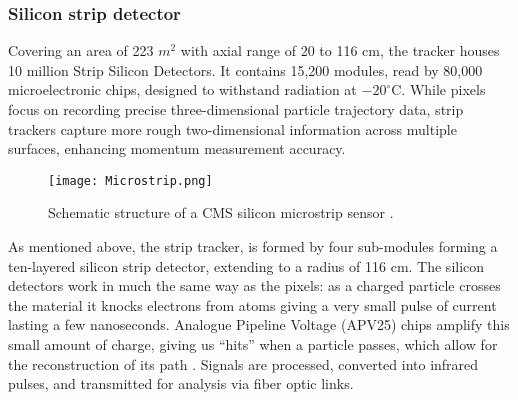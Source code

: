 \subsubsection{\label{subsubsec:exp_CMS_strip} Silicon strip detector}
\noindent Covering an area of 223 $m^2$ with axial range of 20 to 116 cm, the tracker houses 10 million Strip Silicon Detectors. It contains 15,200 modules, read by 80,000 microelectronic chips, designed to withstand radiation at $-20^\circ$C. While pixels focus on recording precise three-dimensional particle trajectory data, strip trackers capture more rough two-dimensional information across multiple surfaces, enhancing momentum measurement accuracy. 
\begin{figure}[H]
    \centering
    \texttt{[image: Microstrip.png]}
    \caption{Schematic structure of a CMS silicon microstrip sensor \cite{Axer:2003ata}.}
    \label{fig:Silicon_microstrip}
\end{figure}
As mentioned above, the strip tracker, is formed by four sub-modules forming a ten-layered silicon strip detector, extending to a radius of 116 cm. The silicon detectors work in much the same way as the pixels: as a charged particle crosses the material it knocks electrons from atoms giving a very small pulse of current lasting a few nanoseconds. Analogue Pipeline Voltage (APV25) chips amplify this small amount of charge, giving us “hits” when a particle passes, which allow for the reconstruction of its path \cite{Silicon_Strips}. Signals are processed, converted into infrared pulses, and transmitted for analysis via fiber optic links.


